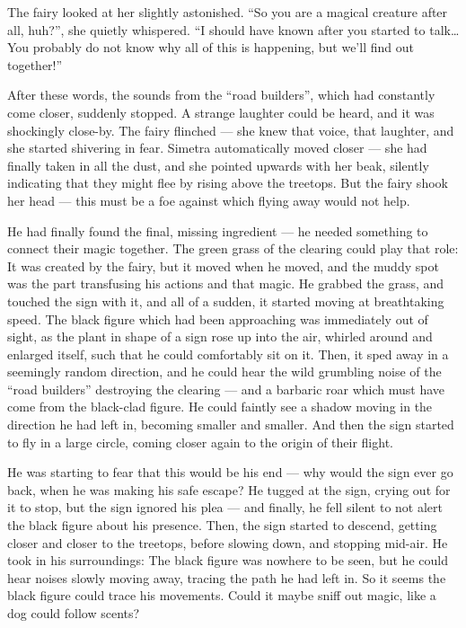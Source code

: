 The fairy looked at her slightly astonished. \enquote{So you are a magical creature after all, huh?}, she quietly whispered. \enquote{I should have known after you started to talk\dots{} You probably do not know why all of this is happening, but we'll find out together!}

After these words, the sounds from the \enquote{road builders}, which had constantly come closer, suddenly stopped. A strange laughter could be heard, and it was shockingly close-by. The fairy flinched --- she knew that voice, that laughter, and she started shivering in fear. Simetra automatically moved closer --- she had finally taken in all the dust, and she pointed upwards with her beak, silently indicating that they might flee by rising above the treetops. But the fairy shook her head --- this must be a foe against which flying away would not help.

\froufrou{}

He had finally found the final, missing ingredient --- he needed something to connect their magic together. The green grass of the clearing could play that role: It was created by the fairy, but it moved when he moved, and the muddy spot was the part transfusing his actions and that magic. He grabbed the grass, and touched the sign with it, and all of a sudden, it started moving at breathtaking speed. The black figure which had been approaching was immediately out of sight, as the plant in shape of a sign rose up into the air, whirled around and enlarged itself, such that he could comfortably sit on it. Then, it sped away in a seemingly random direction, and he could hear the wild grumbling noise of the \enquote{road builders} destroying the clearing --- and a barbaric roar which must have come from the black-clad figure. He could faintly see a shadow moving in the direction he had left in, becoming smaller and smaller. And then the sign started to fly in a large circle, coming closer again to the origin of their flight.

He was starting to fear that this would be his end --- why would the sign ever go back, when he was making his safe escape? He tugged at the sign, crying out for it to stop, but the sign ignored his plea --- and finally, he fell silent to not alert the black figure about his presence. Then, the sign started to descend, getting closer and closer to the treetops, before slowing down, and stopping mid-air. He took in his surroundings: The black figure was nowhere to be seen, but he could hear noises slowly moving away, tracing the path he had left in. So it seems the black figure could trace his movements. Could it maybe sniff out magic, like a dog could follow scents?

